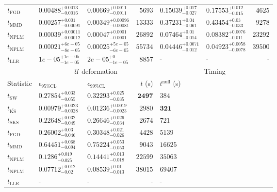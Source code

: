 \begin{tabular}{l|llr|llr}
	$t_{\mathrm{FGD}}$ & $0.00488_{-0.0016}^{+0.0013}$ & $0.00669_{-0.0011}^{+0.0011}$ & $5693$ & $0.15039_{-0.027}^{+0.017}$ & $0.17553_{-0.015}^{+0.012}$ & $4625$ \\
	$t_{\mathrm{MMD}}$ & $0.00257_{-0.00091}^{+0.001}$ & $0.00349_{-0.00081}^{+0.00096}$ & $13333$ & $0.37231_{-0.061}^{+0.04}$ & $0.43454_{-0.033}^{+0.03}$ & $9278$ \\
\rowcolor{red!35}	$t_{\mathrm{NPLM}}$ & $0.00039_{-0.00012}^{+0.00011}$ & $0.00047_{-0.0001}^{+0.0001}$ & $26892$ & $0.07464_{-0.014}^{+0.01}$ & $0.08382_{-0.011}^{+0.0076}$ & $23292$ \\
\rowcolor{blue!35}	$t_{\mathrm{NPLM}}$ & $0.00021_{-8e-05}^{+6e-05}$ & $0.00025_{-6e-05}^{+5e-05}$ & $55734$ & $0.04446_{-0.012}^{+0.0071}$ & $0.04923_{-0.0078}^{+0.0058}$ & $39500$ \\
	$t_{\mathrm{LLR}}$ & $1e-05_{-1e-05}^{+1e-05}$ & $2e-05_{-1e-05}^{+0}$ & $8857$ & - & - & - \\
	\toprule
	\multicolumn{1}{c}{} & \multicolumn{3}{c}{$\mathcal{U}$-deformation} & \multicolumn{3}{c}{Timing} \\
	Statistic & $\epsilon_{95\%\mathrm{CL}}$ & $\epsilon_{99\%\mathrm{CL}}$ & $t$ (s) & $t^{\mathrm{null}}$ (s) \\
	\midrule
	$t_{\mathrm{SW}}$ & $0.27854_{-0.055}^{+0.033}$ & $0.32293_{-0.035}^{+0.025}$ & ${\mathbf{2497}}$ & $384$ \\
	$t_{\overline{\mathrm{KS}}}$ & ${\mathbf{0.00979_{-0.0028}^{+0.0023}}}$ & ${\mathbf{0.01236_{-0.0023}^{+0.0019}}}$ & $2980$ & ${\mathbf{321}}$ \\
	$t_{\mathrm{SKS}}$ & $0.22648_{-0.049}^{+0.032}$ & $0.26646_{-0.034}^{+0.026}$ & $2674$ & $721$ \\
	$t_{\mathrm{FGD}}$ & $0.26002_{-0.046}^{+0.03}$ & $0.30348_{-0.026}^{+0.021}$ & $4428$ & $5139$ \\
	$t_{\mathrm{MMD}}$ & $0.64451_{-0.094}^{+0.068}$ & $0.75224_{-0.053}^{+0.053}$ & $9043$ & $16625$ \\
\rowcolor{red!35}	$t_{\mathrm{NPLM}}$ & $0.1286_{-0.025}^{+0.019}$ & $0.14441_{-0.018}^{+0.013}$ & $22599$ & $35063$ \\
\rowcolor{blue!35}	$t_{\mathrm{NPLM}}$ & $0.07712_{-0.02}^{+0.012}$ & $0.08539_{-0.013}^{+0.01}$ & $38015$ & $69407$ \\
	$t_{\mathrm{LLR}}$ & - & - & - & - \\
	\bottomrule
\end{tabular}